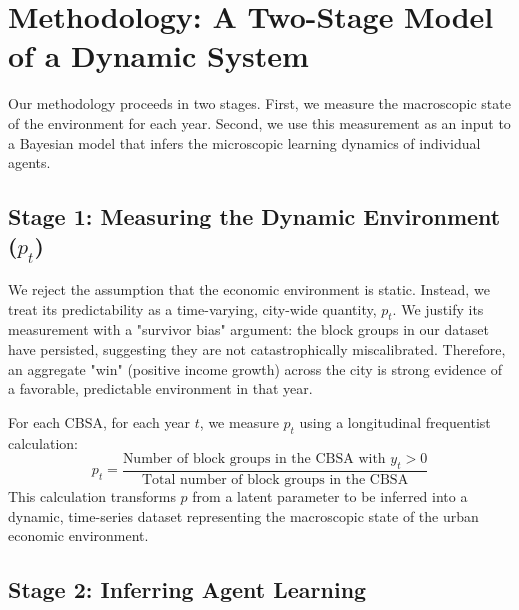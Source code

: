 \documentclass{article}
\begin{document}
\section{Methodology: A Two-Stage Model of a Dynamic System}
Our methodology proceeds in two stages. First, we measure the macroscopic state of the environment for each year. Second, we use this measurement as an input to a Bayesian model that infers the microscopic learning dynamics of individual agents.

\subsection{Stage 1: Measuring the Dynamic Environment (\(p_t\))}
We reject the assumption that the economic environment is static. Instead, we treat its predictability as a time-varying, city-wide quantity, \(p_t\). We justify its measurement with a "survivor bias" argument: the block groups in our dataset have persisted, suggesting they are not catastrophically miscalibrated. Therefore, an aggregate "win" (positive income growth) across the city is strong evidence of a favorable, predictable environment in that year.

For each CBSA, for each year \(t\), we measure \(p_t\) using a longitudinal frequentist calculation:
\begin{equation}
    p_t = \frac{\text{Number of block groups in the CBSA with } y_t > 0}{\text{Total number of block groups in the CBSA}}
\end{equation}
This calculation transforms \(p\) from a latent parameter to be inferred into a dynamic, time-series dataset representing the macroscopic state of the urban economic environment.

\subsection{Stage 2: Inferring Agent Learning}
\end{document}

